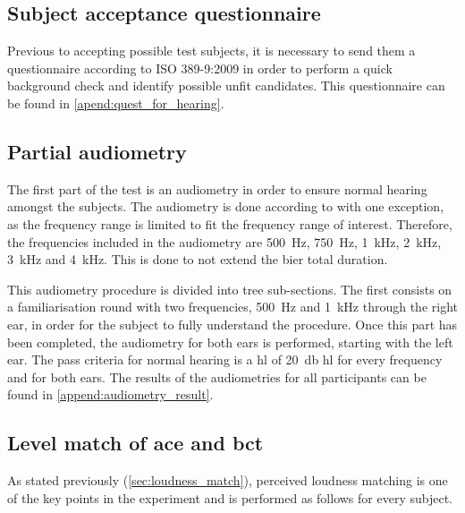 \subsection{Subject acceptance questionnaire}
Previous to accepting possible test subjects, it is necessary to send them a questionnaire according to ISO 389-9:2009 \citep{iso_389-9} in order to perform a quick background check and identify possible unfit candidates. This questionnaire can be found in \autoref{apend:quest_for_hearing}.
  
\subsection{Partial audiometry}
The first part of the test is an audiometry in order to ensure normal hearing amongst the subjects. The audiometry is done according to \citep{iso_8253-2} with one exception, as the frequency range is limited to fit the frequency range of interest. Therefore, the frequencies included in the audiometry are \SI{500}{\hertz}, \SI{750}{\hertz}, \SI{1}{\kilo\hertz}, \SI{2}{\kilo\hertz}, \SI{3}{\kilo\hertz} and \SI{4}{\kilo\hertz}. This is done to not extend the \gls{bier} total duration.

This audiometry procedure is divided into tree sub-sections. The first consists on a familiarisation round with two frequencies, \SI{500}{\hertz} and \SI{1}{\kilo\hertz} through the right ear, in order for the subject to fully understand the procedure. Once this part has been completed, the audiometry for both ears is performed, starting with the left ear. The pass criteria for normal hearing is a \gls{hl} of \SI{20}{\decibel} \gls{hl} for every frequency and for both ears. The results of the audiometries for all participants can be found in \autoref{append:audiometry_result}.
   
\subsection{Level match of \gls{ace} and \gls{bct}}\label{ssec:match}
As stated previously (\autoref{sec:loudness_match}), perceived loudness matching is one of the key points in the experiment and is performed as follows for every subject. 

